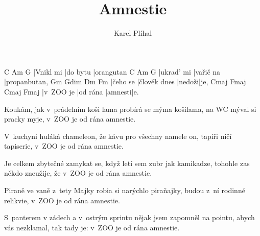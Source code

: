 \documentclass{song}
\title{Amnestie}
\author{Karel Plíhal}
\begin{document}
\strophe
C         Am       G
|Vnikl mi |do bytu |orangutan
C          Am        G
|ukrad' mi |vařič na |propanbutan,
Gm       Gdim         Dm     Fm
|čeho se |člověk dnes |nedoži|je,
Cmaj\7    Fmaj\7   Cmaj\7  Fmaj\7
|v~ZOO je |od rána |amnesti|e.
\endstrophe

\strophe*
Koukám, jak v~prádelním koši lama
probírá se mýma košilama,
na WC mýval si pracky myje,
v~ZOO je od rána amnestie.
\endstrophe

\strophe*
V~kuchyni huláká chameleon,
že kávu pro všechny namele on,
tapíři ničí tapiserie,
v~ZOO je od rána amnestie.
\endstrophe

\strophe*
Je celkem zbytečné zamykat se,
když letí sem zubr jak kamikadze,
tohohle zas někdo zneužije,
že v~ZOO je od rána amnestie.
\endstrophe

\strophe*
Piraně ve vaně z~tety Majky
robia si narýchlo piraňajky,
budou z~ní rodinné relikvie,
v~ZOO je od rána amnestie.
\endstrophe

\strophe*
S~panterem v zádech a v~ostrým sprintu
nějak jsem zapomněl na pointu,
abych vás nezklamal, tak tady je:
v~ZOO je od rána amnestie.
\endstrophe
\end{document}

